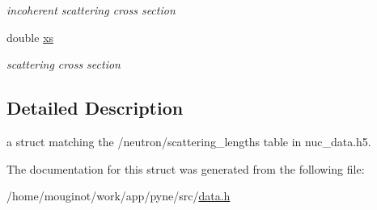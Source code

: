 \begin{DoxyCompactItemize}
\begin{DoxyCompactList}\small\item\em incoherent scattering cross section \end{DoxyCompactList}\item 
\mbox{\label{structpyne_1_1scattering__lengths_aaaab6ef13d13f4058b263f0d28da9ac3}} 
double \hyperlink{structpyne_1_1scattering__lengths_aaaab6ef13d13f4058b263f0d28da9ac3}{xs}
\begin{DoxyCompactList}\small\item\em scattering cross section \end{DoxyCompactList}\end{DoxyCompactItemize}


\subsection{Detailed Description}
a struct matching the \textquotesingle{}/neutron/scattering\+\_\+lengths\textquotesingle{} table in nuc\+\_\+data.\+h5. 

The documentation for this struct was generated from the following file\+:\begin{DoxyCompactItemize}
\item 
/home/mouginot/work/app/pyne/src/\hyperlink{data_8h}{data.\+h}\end{DoxyCompactItemize}
